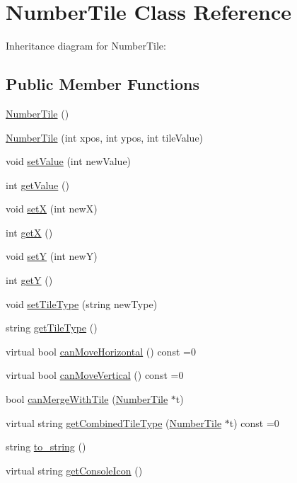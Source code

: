 \hypertarget{classNumberTile}{}\section{Number\+Tile Class Reference}
\label{classNumberTile}


Inheritance diagram for Number\+Tile\+:
\subsection*{Public Member Functions}
\begin{DoxyCompactItemize}
\item 
\hyperlink{classNumberTile_a8263f8868395d47c8cce9e5678e95434}{Number\+Tile} ()
\item 
\hyperlink{classNumberTile_a7ed5d800a193a4e925ac7543ec73d3b6}{Number\+Tile} (int xpos, int ypos, int tile\+Value)
\item 
void \hyperlink{classNumberTile_afdcd9ba36599ad5c7c8788fdb9d31352}{set\+Value} (int new\+Value)
\item 
int \hyperlink{classNumberTile_a7a870508ad2bfbf3e5de48b49db58a56}{get\+Value} ()
\item 
void \hyperlink{classNumberTile_aaa040ff3410c3722b29af28f8f9752e4}{setX} (int newX)
\item 
int \hyperlink{classNumberTile_a20819d16d4d00620c81cd44a56a6452b}{getX} ()
\item 
void \hyperlink{classNumberTile_afbe34f51da300bc1fd9eed4cb9cd47fa}{setY} (int newY)
\item 
int \hyperlink{classNumberTile_a9c827ee17536bc5f0caeca36c7f6e48c}{getY} ()
\item 
void \hyperlink{classNumberTile_aee2c091b10b1c2f457003c59ad233535}{set\+Tile\+Type} (string new\+Type)
\item 
string \hyperlink{classNumberTile_aea8171fadfd8e145fdbbb8f0f757c52e}{get\+Tile\+Type} ()
\item 
virtual bool \hyperlink{classNumberTile_a8bb3cae68a03d39d112ae41e69c5a489}{can\+Move\+Horizontal} () const =0
\item 
virtual bool \hyperlink{classNumberTile_ae1480ce67b65e0144fb9eb5fa56818ed}{can\+Move\+Vertical} () const =0
\item 
bool \hyperlink{classNumberTile_a736e7c1605cc7cae200307672aa01ab8}{can\+Merge\+With\+Tile} (\hyperlink{classNumberTile}{Number\+Tile} $\ast$t)
\item 
virtual string \hyperlink{classNumberTile_ade182f6db206f66401486997cb31ee01}{get\+Combined\+Tile\+Type} (\hyperlink{classNumberTile}{Number\+Tile} $\ast$t) const =0
\item 
string \hyperlink{classNumberTile_af33e3c4937201c189e901615816b0e3c}{to\+\_\+string} ()
\item 
virtual string \hyperlink{classNumberTile_a33a9dad43334d12c5b3842f1a45b1b66}{get\+Console\+Icon} ()
\end{DoxyCompactItemize}
